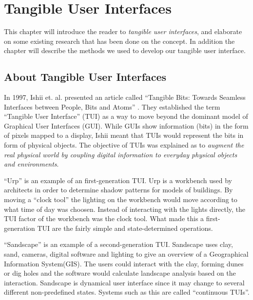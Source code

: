 \chapter{Tangible User Interfaces}
\label{chp:tangibleinterfaces}

This chapter will introduce the reader to \emph{tangible user interfaces}, and elaborate on some existing research that has been done on the concept. In addition the chapter will describe the methods we used to develop our tangible user interface.   

\section{About Tangible User Interfaces}
\label{sec:abouttuis}

In 1997, Ishii et. al. presented an article called ``Tangible Bits: Towards Seamless Interfaces between People, Bits and Atoms'' \cite{ishii1997tangible}. They established the term ``Tangible User Interface'' (TUI) as a way to move beyond the dominant model of Graphical User Interfaces (GUI). 
While GUIs show information (bits) in the form of pixels mapped to a display, Ishii meant that TUIs would represent the bits in form of physical objects. The objective of TUIs was explained as to \emph{augment the real physical world by coupling digital information to everyday physical objects and environments}\cite{ishii1997tangible}. 

``Urp''\cite{underkoffler1999urp} is an example of an first-generation TUI. Urp is a workbench used by architects in order to determine shadow patterns for models of buildings. By moving a ``clock tool'' the lighting on the workbench would move according to what time of day was choosen. Instead of interacting with the lights directly, the TUI factor of the workbench was the clock tool.
What made this a first-generation TUI are the fairly simple and state-determined operations.

``Sandscape''\cite{ishii2004bringing} is an example of a second-generation TUI. Sandscape uses clay, sand, cameras, digital software and lighting to give an overview of a Geographical Information System(GIS). The users could interact with the clay, forming dunes or dig holes and the software would calculate landscape analysis based on the interaction. Sandscape is dynamical user interface since it may change to several different non-predefined states. Systems such as this are called ``continuous TUIs''.

